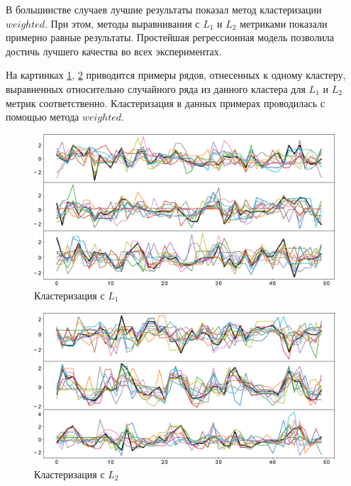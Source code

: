 \documentclass[12pt,twoside]{article}
\begin{document}
    В большинстве случаев лучшие результаты показал метод кластеризации $weighted$.
    При этом, методы выравнивания с $L_1$ и $L_2$ метриками показали примерно равные результаты. Простейшая регрессионная модель позволила достичь лучшего качества во всех экспериментах.
						
    На картинках \ref{img1}, \ref{img2} приводится примеры рядов, отнесенных к одному кластеру,
        выравненных относительно случайного ряда из данного кластера для $L_1$ и $L_2$ метрик соответственно.
    Кластеризация в данных примерах проводилась с помощью метода $weighted$.

    \begin{figure}[h!]
        \includegraphics[width=\textwidth]{images/img2.eps}
        \caption{Кластеризация с $L_1$} \label{img1}
    \end{figure}
    \begin{figure}[h!]
        \includegraphics[width=\textwidth]{images/img3.eps}
        \caption{Кластеризация с $L_2$} \label{img2}
    \end{figure}                
    
    

     
    
    
\end{document}
